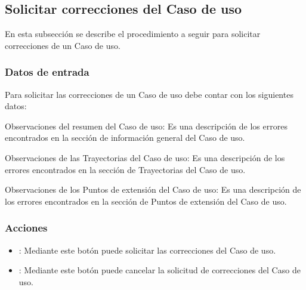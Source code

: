 \subsection{Solicitar correcciones del Caso de uso}

En esta subsección se describe el procedimiento a seguir para solicitar correcciones de un Caso de uso.


\subsubsection{Datos de entrada}
\begin{description}
	\item Para solicitar las correcciones de un Caso de uso debe contar con los siguientes datos: \hspace{10pt}
	\begin{description}
	    \item Observaciones del resumen del Caso de uso: Es una descripción de los errores encontrados en la sección de información general del Caso de uso.
	    \item Observaciones de las Trayectorias del Caso de uso: Es una descripción de los errores encontrados en la sección de Trayectorias del Caso de uso.
	    \item Observaciones de los Puntos de extensión del Caso de uso: Es una descripción de los errores encontrados en la sección de Puntos de extensión del Caso de uso.
	 \end{description}
\end{description}

\subsubsection{Acciones}
\begin{itemize}
  \item {}: Mediante este botón puede solicitar las correcciones del Caso de uso.
  \item {}: Mediante este botón puede cancelar la solicitud de correcciones del Caso de uso.
\end{itemize}


